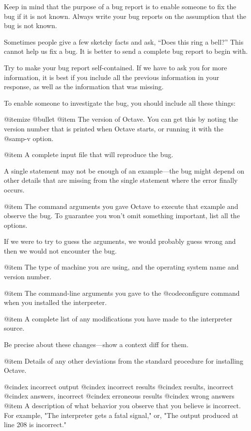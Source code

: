 Keep in mind that the purpose of a bug report is to enable someone to
fix the bug if it is not known. Always write your bug reports on
the assumption that the bug is not known.

Sometimes people give a few sketchy facts and ask, ``Does this ring a
bell?''  This cannot help us fix a bug.  It is better to send a complete
bug report to begin with.

Try to make your bug report self-contained.  If we have to ask you for
more information, it is best if you include all the previous information
in your response, as well as the information that was missing.

To enable someone to investigate the bug, you should include all these
things:

@itemize @bullet
@item
The version of Octave.  You can get this by noting the version number
that is printed when Octave starts, or running it with the @samp{-v}
option.

@item
A complete input file that will reproduce the bug.

A single statement may not be enough of an example---the bug might
depend on other details that are missing from the single statement where
the error finally occurs.

@item
The command arguments you gave Octave to execute that example
and observe the bug.  To guarantee you won't omit something important,
list all the options. 

If we were to try to guess the arguments, we would probably guess wrong
and then we would not encounter the bug.

@item
The type of machine you are using, and the operating system name and
version number.

@item
The command-line arguments you gave to the @code{configure} command when
you installed the interpreter.

@item
A complete list of any modifications you have made to the interpreter
source.

Be precise about these changes---show a context diff for them.

@item
Details of any other deviations from the standard procedure for installing
Octave.

@cindex incorrect output
@cindex incorrect results
@cindex results, incorrect
@cindex answers, incorrect
@cindex erroneous results
@cindex wrong answers
@item
A description of what behavior you observe that you believe is
incorrect.  For example, "The interpreter gets a fatal signal," or, "The
output produced at line 208 is incorrect."

